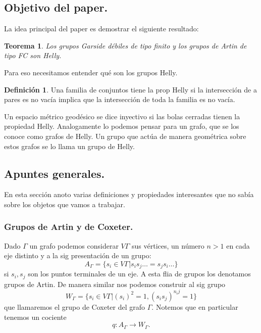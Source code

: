 \documentclass[13pt]{scrartcl}
\theoremstyle{plain} %
\newtheorem{teo}{\color{rojo} Teorema}
\theoremstyle{definition}
\newtheorem{deff}{Definición} %
\theoremstyle{remark}
\newcommand{\blue}{\textcolor{chulo}}
\begin{document}
	\subsection{Objetivo del paper.}
	
	La idea principal del paper es demostrar el siguiente resultado:
	
	\begin{teo}
		Los grupos Garside débiles de tipo finito y los grupos de Artin de tipo FC son Helly.
	\end{teo}
	
	Para eso necesitamos entender qué son los grupos Helly.
	
	\begin{deff}
		Una familia de conjuntos tiene la \blue{prop Helly} si la intersección de a pares es no vacía implica que la intersección de toda la familia es no vacía.
	\end{deff}
	
	Un espacio métrico geodésico se dice \blue{inyectivo} si las bolas cerradas tienen la propiedad Helly. Analogamente lo podemos pensar para un grafo, que se los conoce como \blue{grafos de Helly}. Un grupo que actúa de manera geométrica sobre estos grafos se lo llama un \blue{grupo de Helly}.
	
	\subsection{Apuntes generales.}
	
	En esta sección anoto varias definiciones y propiedades interesantes que no sabía sobre los objetos que vamos a trabajar.
	
	\subsubsection{Grupos de Artin y de Coxeter.}
	
	Dado $\Gamma$ un grafo podemos considerar $V\Gamma$ sus vértices, un número $n>1$ en cada eje distinto y a la sig presentación de un grupo:
	\[
	A_\Gamma = \{ s_i \in V\Gamma | s_is_j \dots = s_j s_i \dots  \}
	\]
	si $s_i, s_j$ son los puntos terminales de un eje. A esta flia de grupos los denotamos grupos de \blue{Artin}. De manera similar nos podemos construir al sig grupo
	\[
	W_\Gamma = \{ s_i \in V\Gamma | (s_i)^2 = 1, (s_is_j)^{n_ij}=1 \}
	\]
	que llamaremos el grupo de \blue{Coxeter} del grafo $\Gamma$. Notemos que en particular tenemos un cociente
	\[
	q: A_\Gamma \to W_\Gamma.
	\]
	
\end{document}
